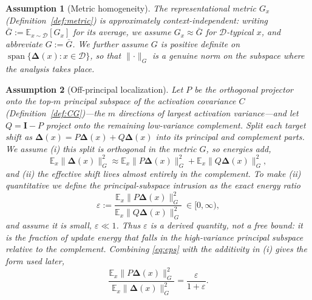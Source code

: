 \documentclass[11pt]{article}
\newtheorem{assumption}{Assumption}[section]
\newcommand{\E}{\mathbb{E}}
\newcommand{\bI}{\mathbf{I}}
\newcommand{\bDelta}{\bm{\Delta}}
\newcommand{\Gnorm}[1]{\lVert #1\rVert_G}
\begin{document}
\begin{assumption}[Metric homogeneity]\label{as:homog}
The representational metric $G_x$ (Definition~\ref{def:metric}) is approximately
context-independent: writing $\bar G:=\E_{x\sim\mathcal D}[G_x]$ for its average, we assume
$G_x\approx\bar G$ for $\mathcal D$-typical $x$, and abbreviate $G:=\bar G$. We further assume $G$
is positive definite on $\operatorname{span}\{\bDelta(x):x\in\mathcal D\}$, so that
$\Gnorm{\cdot}$ is a genuine norm on the subspace where the analysis takes place.
\end{assumption}

\begin{assumption}[Off-principal localization]\label{as:offprin}
Let $P$ be the orthogonal projector onto the top-$m$ principal subspace of the activation
covariance $C$ (Definition~\ref{def:CG})---the $m$ directions of largest activation variance---and
let $Q=\bI-P$ project onto the remaining low-variance \emph{complement}. Split each target shift as
$\bDelta(x)=P\bDelta(x)+Q\bDelta(x)$ into its principal and complement parts. We assume (i) this
split is orthogonal in the metric $G$, so energies add,
\begin{equation*}
\E_x\Gnorm{\bDelta(x)}^2\approx\E_x\Gnorm{P\bDelta(x)}^2+\E_x\Gnorm{Q\bDelta(x)}^2,
\end{equation*}
and (ii) the effective shift lives almost entirely in the complement. To make (ii) quantitative we
\emph{define} the \emph{principal-subspace intrusion} as the exact energy ratio
\begin{equation}\label{eq:eps}
\varepsilon:=\frac{\E_x\Gnorm{P\bDelta(x)}^2}{\E_x\Gnorm{Q\bDelta(x)}^2}\ \in[0,\infty) ,
\end{equation}
and assume it is small, $\varepsilon\ll1$. Thus $\varepsilon$ is a \emph{derived quantity}, not a
free bound: it is the fraction of update energy that falls in the high-variance principal subspace
relative to the complement. Combining \eqref{eq:eps} with the additivity in (i) gives the form used
later,
\begin{equation}\label{eq:epsfrac}
\frac{\E_x\Gnorm{P\bDelta(x)}^2}{\E_x\Gnorm{\bDelta(x)}^2}=\frac{\varepsilon}{1+\varepsilon} .
\end{equation}
\end{assumption}
\end{document}
